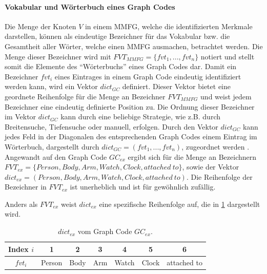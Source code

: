\paragraph{Vokabular und Wörterbuch eines Graph Codes}
\label{sec2:sota:par:gc-vocabulary-dictionary}
Die Menge der Knoten $V$ in einem MMFG, welche die identifizierten Merkmale darstellen, können als eindeutige Bezeichner für das Vokabular bzw. die Gesamtheit aller Wörter, welche einen MMFG ausmachen, betrachtet werden.
Die Menge dieser Bezeichner wird mit $FVT_{MMFG}=\{fvt_1,...,fvt_n\}$ notiert und stellt somit die Elemente des \enquote{Wörterbuchs} eines Graph Codes dar.
Damit ein Bezeichner $fvt_i$ eines Eintrages in einem Graph Code eindeutig identifiziert werden kann, wird ein Vektor $dict_{GC}$ definiert.
Dieser Vektor bietet eine geordnete Reihenfolge für die Menge an Bezeichner $FVT_{MMFG}$ und weist jedem Bezeichner eine eindeutig definierte Position zu.
Die Ordnung dieser Bezeichner im Vektor $dict_{GC}$ kann durch eine beliebige Strategie, wie z.B. durch Breitensuche, Tiefensuche oder manuell, erfolgen.
Durch den Vektor $dict_{GC}$ kann jedes Feld in der Diagonalen des entsprechenden Graph Codes einem Eintrag im Wörterbuch, dargestellt durch $dict_{GC} = (fvt_1,...,fvt_n)$, zugeordnet werden \cite{gc-2d-proj-mmfg}.
Angewandt auf den Graph Code $GC_{ex}$ ergibt sich für die Menge an Bezeichnern $FVT_{ex}=\{Person,Body,Arm,Watch,Clock,attached~to\}$, sowie der Vektor $dict_{ex}=(Person,Body,Arm,Watch,Clock,attached~to)$.
Die Reihenfolge der Bezeichner in $FVT_{ex}$ ist unerheblich und ist für gewöhnlich zufällig.

Anders als $FVT_{ex}$ weist $dict_{ex}$ eine spezifische Reihenfolge auf, die in \cref{sec2:sota:par:gc-vocabulary-dictionary:tab:dict-ex} dargestellt wird.

\begin{table}[htb]
    \centering
    \begin{tabular}{c|c|c|c|c|c|c}
         Index $i$ & 1 & 2 & 3 & 4 & 5 & 6 \\ \hline
         $fvt_i$ & Person & Body & Arm & Watch & Clock & attached to
    \end{tabular}
    \caption{$dict_{ex}$ vom Graph Code $GC_{ex}$.}
    \label{sec2:sota:par:gc-vocabulary-dictionary:tab:dict-ex}
\end{table}

